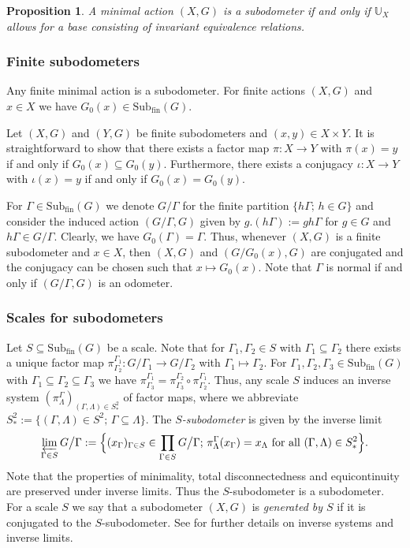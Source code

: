 \documentclass[12pt, reqno]{amsart}
\newtheorem{proposition}[theorem]{Proposition}
\theoremstyle{definition}
\theoremstyle{remark}
\numberwithin{equation}{section}
\theoremstyle{theorem}
\theoremstyle{remark}
\def\subfin{{\operatorname{Sub_{fin}}}}
\begin{document}
\begin{proposition}\cite[Proposition~3.2]{cortez2026minimal} 
\label{pro:characterizationEquicontinuousStone} 
    A minimal action $(X,G)$ is a subodometer if and only if $\mathbb{U}_X$ allows for a base consisting of invariant equivalence relations. 
\end{proposition}


\subsubsection{Finite subodometers}
\label{subsubsec:prelims_subodometers_FiniteSubodometers} 
Any finite minimal action is a subodometer.
For finite actions $(X,G)$ and $x\in X$ we have $G_0(x)\in \subfin(G)$. 

Let $(X,G)$ and $(Y,G)$ be finite subodometers and $(x,y)\in X\times Y$. It is straightforward to show that there exists a factor map $\pi\colon X\to Y$ with $\pi(x)=y$ if and only if $G_0(x)\subseteq G_0(y)$. 
Furthermore, there exists a conjugacy $\iota\colon X\to Y$ with $\iota(x)=y$ if and only if $G_0(x) = G_0(y)$. 

For $\Gamma\in \subfin(G)$ we denote $G/\Gamma$ for the finite partition $\{h\Gamma;\, h\in G\}$ and consider the induced action $(G/\Gamma,G)$ given by $g.(h\Gamma):=gh\Gamma$ for $g\in G$ and $h\Gamma\in G/\Gamma$. 
Clearly, we have $G_0(\Gamma)=\Gamma$.
Thus, whenever $(X,G)$ is a finite subodometer and $x\in X$, then $(X,G)$ and $(G/G_0(x),G)$ are conjugated and the conjugacy can be chosen such that $x\mapsto G_0(x)$. 
Note that $\Gamma$ is normal if and only if $(G/\Gamma,G)$ is an odometer. 

\subsubsection{Scales for subodometers}
\label{subsubsec:prelims_subodometers_ScalesForSubodometers}
Let $S\subseteq \subfin(G)$ be a scale.
Note that for $\Gamma_1,\Gamma_2\in S$ with $\Gamma_1\subseteq \Gamma_2$ there exists a unique factor map $\pi_{\Gamma_2}^{\Gamma_1}\colon G/\Gamma_1 \to G/\Gamma_2$ with $\Gamma_1\mapsto \Gamma_2$. 
For $\Gamma_1,\Gamma_2,\Gamma_3\in \subfin(G)$ with $\Gamma_1\subseteq \Gamma_2\subseteq \Gamma_3$ we have $\pi_{\Gamma_3}^{\Gamma_1}=\pi_{\Gamma_3}^{\Gamma_2}\circ \pi_{\Gamma_2}^{\Gamma_1}$. 
Thus, any scale $S$ induces an inverse system $(\pi_{\Lambda}^{\Gamma})_{(\Gamma,\Lambda)\in S_*^2}$ of factor maps, where we abbreviate 
$S_*^2:=\{(\Gamma,\Lambda)\in S^2;\, \Gamma\subseteq \Lambda\}$.
The \emph{$S$-subodometer} is given by the inverse limit 
    \[
    \varprojlim_{\Gamma \in S} G\big/\Gamma 
    := 
    \Bigl\{ (x_\Gamma)_{\Gamma \in S} \in \prod_{\Gamma \in S} G\big/\Gamma 
    ;\, 
    \pi_{\Lambda}^\Gamma(x_\Gamma) = x_{\Lambda} \text{ for all } (\Gamma,\Lambda)\in S_*^2
    \Bigr\}.
    \] 
Note that the properties of minimality, total disconnectedness and equicontinuity are preserved under inverse limits.
Thus the $S$-subodometer is a subodometer. 
For a scale $S$ we say that a subodometer $(X,G)$ is \emph{generated by $S$} if it is conjugated to the $S$-subodometer.     
See \cite[Section 1.1]{ribes2000profinite} for further details on inverse systems and inverse limits. 
\end{document}
